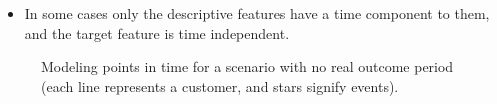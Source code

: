 \documentclass[xcolor={table}]{beamer}
\begin{document}
\begin{frame}
\begin{itemize}
\item In some cases only the descriptive features have a time component to them, and the target feature is time independent.
\end{itemize}
\begin{figure}[htb]
	\begin{center}
	\end{center}
	\caption{Modeling points in time for a scenario with no real outcome period (each line represents a customer, and stars signify events).}
	\label{fig:pointInTimeDiscussionNoOutcome}
\end{figure}
\end{frame} 
\end{document}
